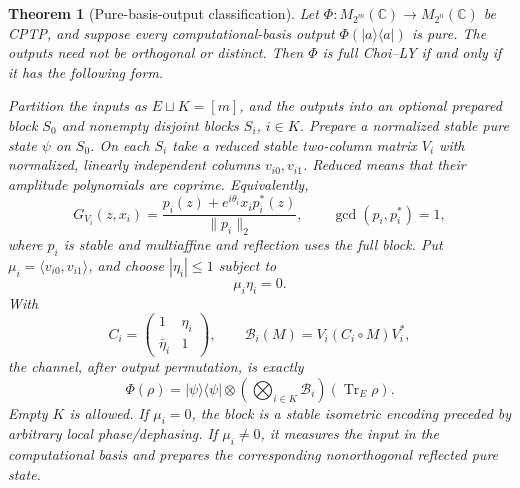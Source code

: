 \documentclass[reqno]{amsart}
\newtheorem{theorem}{Theorem}[section]
\theoremstyle{definition}
\theoremstyle{remark}
\newcommand{\C}{\mathbb C}
\DeclareMathOperator{\Tr}{Tr}
\begin{document}
\begin{theorem}[Pure-basis-output classification]
\label{stat:pure-basis}
Let \(\Phi:M_{2^m}(\C)\to M_{2^n}(\C)\) be CPTP, and suppose
every computational-basis output \(\Phi(|a\rangle\langle a|)\)
is pure.  The outputs need not be orthogonal or distinct.  Then
\(\Phi\) is full Choi--LY if and only if it has the following
form.

Partition the inputs as \(E\sqcup K=[m]\), and the outputs into
an optional prepared block \(S_0\) and nonempty disjoint blocks
\(S_i\), \(i\in K\).  Prepare a normalized stable pure state
\(\psi\) on \(S_0\).  On each \(S_i\) take a reduced stable
two-column matrix \(V_i\) with normalized, linearly independent
columns \(v_{i0},v_{i1}\).  Reduced means that their amplitude
polynomials are coprime.  Equivalently,
\begin{equation}
 G_{V_i}(z,x_i)=
 \frac{p_i(z)+e^{i\theta_i}x_i p_i^*(z)}{\|p_i\|_2},
 \qquad \gcd(p_i,p_i^*)=1,
 \label{stat:pure-pair}
\end{equation}
where \(p_i\) is stable and multiaffine and reflection uses the
full block.  Put \(\mu_i=\langle v_{i0},v_{i1}\rangle\), and
choose \(|\eta_i|\le1\) subject to
\begin{equation}
 \mu_i\eta_i=0.
 \label{stat:overlap-noise}
\end{equation}
With
\[
 C_i=\begin{pmatrix}1&\eta_i\\\bar\eta_i&1\end{pmatrix},
 \qquad
 \mathcal B_i(M)=V_i(C_i\circ M)V_i^*,
\]
the channel, after output permutation, is exactly
\begin{equation}
 \Phi(\rho)=|\psi\rangle\langle\psi|\otimes
       \left(\bigotimes_{i\in K}\mathcal B_i\right)
                         (\Tr_E\rho).
 \label{stat:pure-basis-form}
\end{equation}
Empty \(K\) is allowed.  If \(\mu_i=0\), the block is a stable
isometric encoding preceded by arbitrary local phase/dephasing.
If \(\mu_i\ne0\), it measures the input in the computational
basis and prepares the corresponding nonorthogonal reflected
pure state.
\end{theorem}
\end{document}
